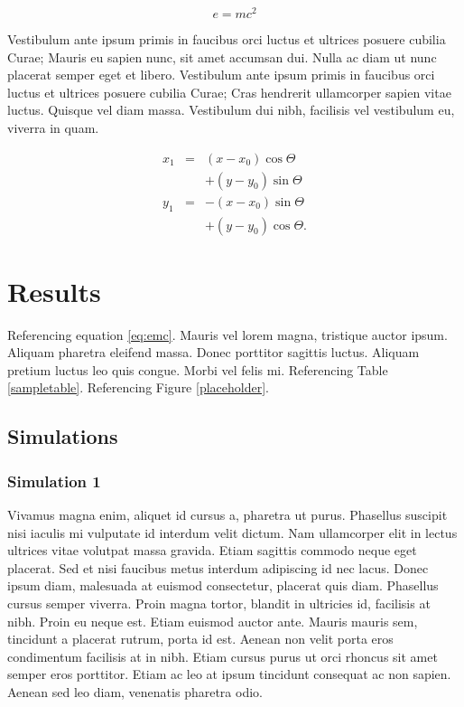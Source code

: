 \documentclass[draft,wrr]{AGUTeX}
\begin{document}
\begin{article}
\begin{equation}
\label{eq:emc}
e = mc^2
\end{equation}

Vestibulum ante ipsum primis in faucibus orci luctus et ultrices posuere cubilia Curae; Mauris eu sapien nunc, sit amet accumsan dui. Nulla ac diam ut nunc placerat semper eget et libero. Vestibulum ante ipsum primis in faucibus orci luctus et ultrices posuere cubilia Curae; Cras hendrerit ullamcorper sapien vitae luctus. Quisque vel diam massa. Vestibulum dui nibh, facilisis vel vestibulum eu, viverra in quam.

\begin{eqnarray}
  x_{1} & = & (x - x_{0}) \cos \Theta \nonumber \\
        && + (y - y_{0}) \sin \Theta  \nonumber \\
  y_{1} & = & -(x - x_{0}) \sin \Theta \nonumber \\
        && + (y - y_{0}) \cos \Theta.
\end{eqnarray}


\section{Results}

Referencing equation \ref{eq:emc}. Mauris vel lorem magna, tristique auctor ipsum. Aliquam pharetra eleifend massa. Donec porttitor sagittis luctus. Aliquam pretium luctus leo quis congue. Morbi vel felis mi. Referencing Table \ref{sampletable}. Referencing Figure \ref{placeholder}.

\subsection{Simulations}

\subsubsection{Simulation 1}

Vivamus magna enim, aliquet id cursus a, pharetra ut purus. Phasellus suscipit nisi iaculis mi vulputate id interdum velit dictum. Nam ullamcorper elit in lectus ultrices vitae volutpat massa gravida. Etiam sagittis commodo neque eget placerat. Sed et nisi faucibus metus interdum adipiscing id nec lacus. Donec ipsum diam, malesuada at euismod consectetur, placerat quis diam. Phasellus cursus semper viverra. Proin magna tortor, blandit in ultricies id, facilisis at nibh. Proin eu neque est. Etiam euismod auctor ante. Mauris mauris sem, tincidunt a placerat rutrum, porta id est. Aenean non velit porta eros condimentum facilisis at in nibh. Etiam cursus purus ut orci rhoncus sit amet semper eros porttitor. Etiam ac leo at ipsum tincidunt consequat ac non sapien. Aenean sed leo diam, venenatis pharetra odio.


\end{article}
\end{document}
